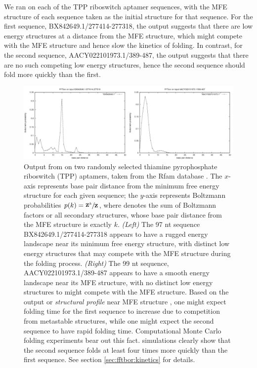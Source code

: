 We ran \fftbor on each of the TPP riboswitch aptamer
sequences, with the MFE structure of each
sequence taken as the initial structure \strSt for that sequence. For the
first sequence, BX842649.1/277414-277318, the \fftbor output
suggests that there are low energy structures
at a distance from the MFE structure, which might compete with the MFE
structure and hence slow the kinetics of folding. In contrast, for the
second sequence, AACY022101973.1/389-487, the \fftbor output suggests
that there are no such competing low energy structures, hence
the second sequence should fold more quickly than the first.

\begin{figure}[!h]
\centering
\includegraphics[width=\textwidth]{Figures/FFTbor/tppDistributions.pdf}
\caption{Output from \fftbor on two randomly selected
thiamine pyrophosphate riboswitch (TPP) aptamers, taken from the Rfam database
\cite{Gardner.nar11}. The $x$-axis represents base pair distance from the
minimum free energy structure for each given sequence; the $y$-axis represents
Boltzmann probabilities $p(k) = \sfrac{{\bf Z}^{k}_{}}{{\bf Z}^{}_{}}$, where
 denotes the sum of Boltzmann factors or all secondary structures,
whose base pair distance from the MFE structure is exactly $k$.
{\em (Left)}
The 97 nt sequence BX842649.1/277414-277318 appears to have a rugged energy
landscape near its minimum free energy structure, with distinct
low energy structures that may compete with the MFE structure during the
folding process.
{\em (Right)}
The 99 nt sequence, AACY022101973.1/389-487 appears to have a smooth energy
landscape near its MFE structure, with no distinct low energy structures
to might compete with the MFE structure.
Based on the \fftbor output or {\em structural profile} near MFE
structure \strSt, one might expect
folding time for the first sequence to increase due to competition from
metastable structures, while one might expect the second sequence to have
rapid folding time.
Computational Monte Carlo folding experiments bear out this fact.
\kinfold \cite{flamm} simulations clearly show that the second
sequence folds
at least four times more quickly than the first sequence. See section
\ref{sec:fftbor:kinetics} for
details.}
\label{fig:fftbor:tppDistributions}
\end{figure}

